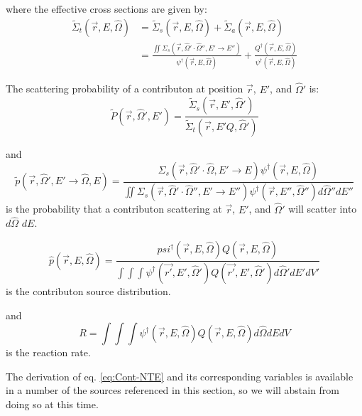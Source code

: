 where the effective cross sections are given by:
\begin{equation}
\begin{aligned}
\widetilde{\Sigma}_{t}(\vec{r}, E, \hat\Omega) &=
        \widetilde{\Sigma}_{s}(\vec{r}, E, \hat\Omega) +
        \widetilde{\Sigma}_{a}(\vec{r}, E, \hat\Omega)    \\
     &= \frac{\iint \Sigma_{s}(\vec{r},\hat\Omega'\cdot\hat\Omega'',
        E'\rightarrow E'')}{\psi^{\dagger}(\vec{r}, E, \hat\Omega)}
        + \frac{Q^{\dagger}(\vec{r}, E, \hat\Omega)}
        {\psi^{\dagger}(\vec{r}, E, \hat\Omega)}
\end{aligned}
\end{equation}

The scattering probability of a contributon at position $\vec{r}$, $E'$, and
$\hat\Omega'$ is:
\begin{equation}
\widetilde{P}(\vec{r}, \hat\Omega',E') =
         \frac{\widetilde{\Sigma} _{ s }(\vec{r}, E', \hat\Omega')}
       {\widetilde{\Sigma} _{ t }(\vec{r}, E'Q, \hat\Omega')}
\end{equation}

and
\begin{equation}
\widetilde{p}(\vec{r}, \hat\Omega', E'\rightarrow\hat\Omega, E) =
       \frac{\Sigma_{s}(\vec{r},\hat\Omega'\cdot\hat\Omega,E'\rightarrow E)
       \psi^{\dagger} (\vec{r}, E, \hat\Omega)}
       {\iint \Sigma_{s}(\vec{r},\hat\Omega'\cdot\hat\Omega'',E'\rightarrow
       E'')\psi^{\dagger} (\vec{r}, E'', \hat\Omega'')d\hat\Omega'' dE''}
\end{equation}
is the probability that a contributon scattering at $\vec{r}$, $E'$, and $\hat\Omega'$ will scatter into $d\hat\Omega$ $dE$.

\begin{equation}
\hat p(\vec{r}, E, \hat\Omega) =
\frac{psi^{\dagger}(\vec{r}, E, \hat\Omega) Q(\vec{r},E,\hat\Omega)}
     {\int \int \int \psi^{\dagger}(\vec{r'},E',\hat\Omega')
     Q(\vec{r'},E',\hat\Omega') d\hat\Omega' dE' dV'}
\end{equation}
is the contributon source distribution.

and
\begin{equation}
R = \int \int \int \psi^{\dagger}(\vec{r},E,\hat\Omega)Q(\vec{r},E,\hat\Omega)
    d\hat\Omega dE dV
\end{equation}
is the reaction rate.


The derivation of eq. \ref{eq:Cont-NTE} and its corresponding variables is
available in a number of the sources referenced in this section, so we will
abstain from doing so at this time.

